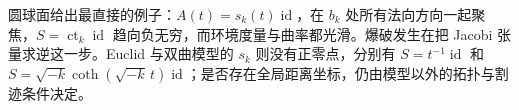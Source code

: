 圆球面给出最直接的例子：\(A(t)=s_k(t)\operatorname{id}\)，在 \(b_k\) 处所有法向方向一起聚焦，\(S=\operatorname{ct}_k\operatorname{id}\) 趋向负无穷，而环境度量与曲率都光滑。爆破发生在把 Jacobi 张量求逆这一步。Euclid 与双曲模型的 \(s_k\) 则没有正零点，分别有 \(S=t^{-1}\operatorname{id}\) 和 \(S=\sqrt{-k}\coth(\sqrt{-k}\,t)\operatorname{id}\)；是否存在全局距离坐标，仍由模型以外的拓扑与割迹条件决定。
